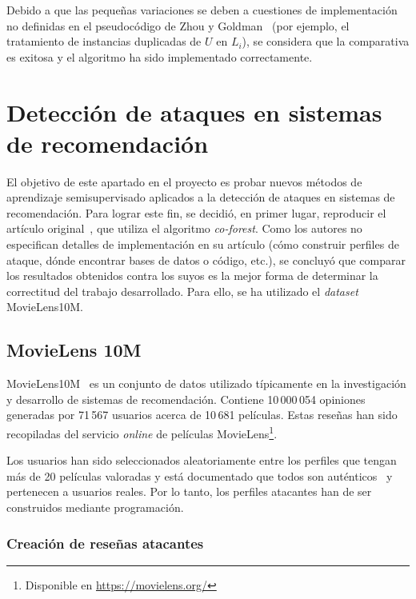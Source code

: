 Debido a que las pequeñas variaciones se deben a cuestiones de implementación no definidas en el pseudocódigo de Zhou y Goldman~\cite{democraticCoLearning2004original} (por ejemplo, el tratamiento de instancias duplicadas de $U$ en $L_i$), se considera que la comparativa es exitosa y el algoritmo ha sido implementado correctamente.


\section{Detección de ataques en sistemas de recomendación}
\label{sec:5_detec_ataques}
El objetivo de este apartado en el proyecto es probar nuevos métodos de aprendizaje semisupervisado aplicados a la detección de ataques en sistemas de recomendación. Para lograr este fin, se decidió, en primer lugar, reproducir el artículo original~\cite{zhou2021SemisupervisedRecommendationAttack}, que utiliza el algoritmo \textit{co-forest}. Como los autores no especifican detalles de implementación en su artículo (cómo construir perfiles de ataque, dónde encontrar bases de datos o código, etc.), se concluyó que comparar los resultados obtenidos contra los suyos es la mejor forma de determinar la correctitud del trabajo desarrollado. Para ello, se ha utilizado el \textit{dataset} MovieLens10M.

\subsection{MovieLens 10M}

MovieLens10M~\cite{groupLensDatasets} es un conjunto de datos utilizado típicamente en la investigación y desarrollo de sistemas de recomendación. Contiene 10\,000\,054 opiniones generadas por 71\,567 usuarios acerca de 10\,681 películas. Estas reseñas han sido recopiladas del servicio \textit{online} de películas MovieLens\footnote{ Disponible en {\url{https://movielens.org/}}}.

Los usuarios han sido seleccionados aleatoriamente entre los perfiles que tengan más de 20 películas valoradas y está documentado que todos son auténticos~\cite{zhou2021SemisupervisedRecommendationAttack} y pertenecen a usuarios reales. Por lo tanto, los perfiles atacantes han de ser construidos mediante programación.

\subsubsection{Creación de reseñas atacantes}
\label{sec:creacion_reseñas_atacantes}

